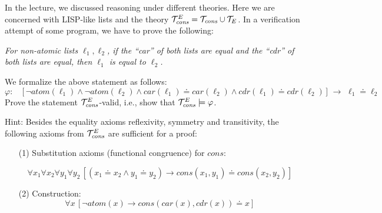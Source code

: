 \documentclass[11pt,a4paper]{uebung}
\def\impl{\rightarrow}
\begin{document}
\newcommand{\semder}{\models}
In the lecture, we discussed reasoning under different theories. Here we are
concerned with LISP-like lists and the theory ${\cal T}_{\mathit{cons}}^E =
{\cal T}_{\mathit{cons}}\cup {\cal T}_E$.  In a verification attempt of some program,
we have to prove the following:
\begin{center}
\begin{minipage}{0.8\textwidth}
{\em For non-atomic lists $\ell_1, \ell_2$, if the ``car'' of both lists are
  equal and the ``cdr'' of both lists are equal, then $\ell_1$ is equal to
  $\ell_2$.  }
\end{minipage}
\end{center}
We formalize the above statement as follows:
$$ \varphi \colon \quad
\big[\, \neg \textit{atom}(\ell_1) \land \neg \textit{atom}(\ell_2) \land 
\textit{car}(\ell_1)  \doteq \textit{car}(\ell_2) \land  
\textit{cdr}(\ell_1) \doteq \textit{cdr}(\ell_2) \, \big] \,\, 
\impl \,\,  \ell_1 \doteq \ell_2  
$$
Prove the statement ${\cal T}_{\mathit{cons}}^E$-valid, i.e., show that
$\caT_{\mathit{cons}}^E \semder \varphi$.

\medskip

Hint: Besides the equality axioms reflexivity, symmetry and transitivity, the
following axioms from ${\cal T}_{\mathit{cons}}^E$ are sufficient for a proof:
\begin{itemize}

\item[(1)] Substitution axioms (functional congruence) for
  $\textit{cons}$: 

  $$\forall x_1\forall x_2 \forall y_1 \forall y_2 \, [
(x_1 \doteq x_2 \land y_1 \doteq y_2) \impl   
\textit{cons}(x_1,y_1) \doteq \textit{cons}(x_2,y_2)]$$
\item[(2)] Construction:
$$\forall x\, [\neg \textit{atom}(x) \impl 
\textit{cons}(\textit{car}(x), \textit{cdr}(x)) \doteq x] $$ 

\end{itemize}
\end{document}
